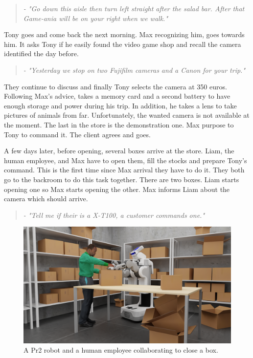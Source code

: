 \begin{quote} 
\centering 
\textit{
- "Go down this aisle then turn left straight after the salad bar. After that Game-ania will be on your right when we walk."}
\end{quote}

Tony goes and come back the next morning. Max recognizing him, goes towards him. It asks Tony if he easily found the video game shop and recall the camera identified the day before.

\begin{quote} 
\centering 
\textit{
- "Yesterday we stop on two Fujifilm cameras and a Canon for your trip."}
\end{quote}

They continue to discuss and finally Tony selects the camera at 350 euros. Following Max's advice, takes a memory card and a second battery to have enough storage and power during his trip. In addition, he takes a lens to take pictures of animals from far. Unfortunately, the wanted camera is not available at the moment. The last in the store is the demonstration one. Max purpose to Tony to command it. The client agrees and goes.

A few days later, before opening, several boxes arrive at the store. Liam, the human employee, and Max have to open them, fill the stocks and prepare Tony's command. This is the first time since Max arrival they have to do it. They both go to the backroom to do this task together. There are two boxes. Liam starts opening one so Max starts opening the other. Max informs Liam about the camera which should arrive.

\begin{quote} 
\centering 
\textit{
- "Tell me if their is a X-T100, a customer commands one."}
\end{quote}

\begin{figure}[h!]
\centering
\includegraphics[width=\textwidth]{figures/introduction/camera_store_4.png}
\caption{\label{fig:cam_back} A Pr2 robot and a human employee collaborating to close a box. }
\end{figure}

